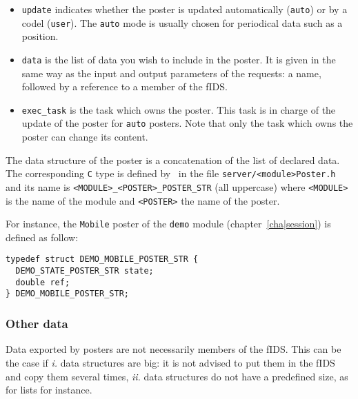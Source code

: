 \begin{itemize}
\item \texttt{update} indicates whether the poster is updated automatically
(\texttt{auto}) or by  a codel (\texttt{user}). The  \texttt{auto} mode is usually
chosen for periodical data such as a position.

\item \texttt{data} is the list of data you wish to include in the
poster. It is given in the same way as the input and output parameters of
the requests: a name, followed by a reference to a member of the fIDS.

\item \texttt{exec\_task} is the task which owns the poster. This task is in
charge of the update of the poster for \texttt{auto} posters. Note that only
the task which owns the poster can change its content.
\end{itemize}

The data  structure  of the  poster is  a concatenation  of  the  list of
declared data.  The corresponding  \texttt{C} type  is defined by \GenoM\ in
the     file   \texttt{server/<module>Poster.h} and     its    name  is  
\texttt{<MODULE>\_<POSTER>\_POSTER\_STR} (all uppercase) where \texttt{<MODULE>} is the name
of the module and \texttt{<POSTER>} the name of the poster.

For  instance,   the \texttt{Mobile}  poster  of    the \texttt{demo}  module
(chapter~\ref{cha|session}) is defined as follow:

\begin{center}\begin{cartouche}\small\begin{verbatim}
typedef struct DEMO_MOBILE_POSTER_STR {
  DEMO_STATE_POSTER_STR state;
  double ref;
} DEMO_MOBILE_POSTER_STR;
\end{verbatim}\end{cartouche}\end{center}


\subsubsection{Other data}

Data exported by posters  are not necessarily members  of the fIDS.  This
can be the case if \emph{i.} data structures are big: it is not advised to
put  them in   the fIDS and   copy them  several times, \emph{ii.}  data
structures do not have a predefined size, as for lists for instance.

